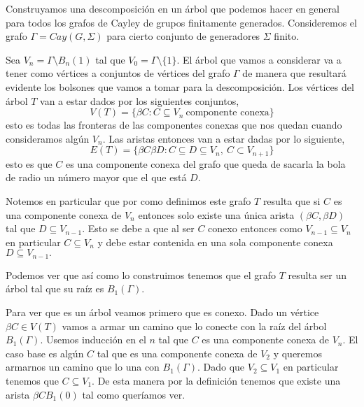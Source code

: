 \documentclass[tesis.tex]{subfiles}
\begin{document}
\begin{ej}\label{desc-grafo-cayley}%
	
	Construyamos una descomposición en un árbol que podemos hacer en general para todos los grafos de Cayley de grupos finitamente generados. 
	Consideremos el grafo $\Gamma = Cay(G,\Sigma)$ para cierto conjunto de generadores $\Sigma$ finito.
	
	Sea $V_n = \Gamma \setminus B_n(1) $ tal que $V_0 = \Gamma \setminus \{1\}$. 
	El árbol que vamos a considerar va a tener como vértices a conjuntos de vértices del grafo $\Gamma$ de manera que resultará evidente los bolsones que vamos a tomar para la descomposición. 
	Los vértices del árbol $T$ van a estar dados por los siguientes conjuntos,
	\[
	V(T) = \{  \beta C : C \subseteq V_n \ \text{componente conexa}   \}
	\]
	esto es todas las fronteras de las componentes conexas que nos quedan cuando consideramos algún $V_n$. 
	Las aristas entonces van a estar dadas por lo siguiente,
	\[
	E(T) = \{ \beta C \beta D : C \subseteq D \subseteq V_n, \ C \subset V_{n+1}   \}
	\]
	esto es que $C$ es una componente conexa del grafo que queda de sacarla la bola de radio un número mayor que el que está $D$.
	
	Notemos en particular que por como definimos este grafo $T$ resulta que si $C$ es una componente conexa de $V_n$ entonces solo existe una única arista $(\beta C, \beta D)$ tal que $D \subseteq V_{n-1}$. 
	Esto se debe a que al ser $C$ conexo entonces como $V_{n-1} \subseteq V_{n}$ en particular $C \subseteq V_{n}$ y debe estar contenida en una sola componente conexa $D \subseteq V_{n-1}.$
	
	
	Podemos ver que así como lo construimos tenemos que el grafo $T$ resulta ser un árbol tal que su raíz es $B_1(\Gamma)$. 
	
	Para ver que es un árbol veamos primero que es conexo. Dado un vértice $\beta C \in V(T)$ vamos a armar un camino que lo conecte con la raíz del árbol $B_1(\Gamma)$. 
	Usemos inducción en el $n$ tal que $C$ es una componente conexa de $V_n$. 
	El caso base es algún $C$ tal que es una componente conexa de $V_2$ y queremos armarnos un camino que lo una con $B_1(\Gamma)$. 
	Dado que $V_2 \subseteq V_1$ en particular tenemos que $C \subseteq V_1$. De esta manera por la definición tenemos que existe una arista $\beta CB_1(0)$ tal como queríamos ver.
	

\end{ej}
\end{document}
